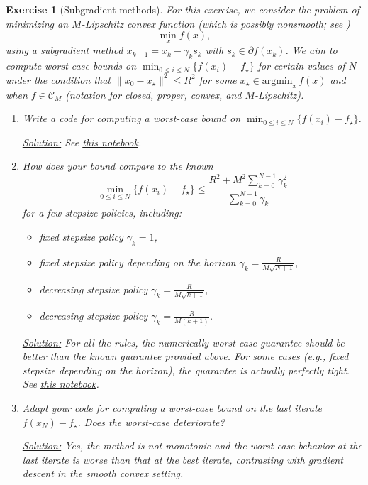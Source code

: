 \documentclass[11pt,a4paper]{article}
\newcommand{\correction}[1]{{{\color{blue}\underline{Solution:} #1}}}
\newcommand{\correction}[1]{}
\newtheorem{exercise}{Exercise}
\begin{document}
\begin{exercise}[Subgradient methods]\label{ex:subgradient} For this exercise, we consider the problem of minimizing an $M$-Lipschitz convex function (which is possibly nonsmooth; see )
	\[ \min_{x} f(x),\]
using a subgradient method $x_{k+1}=x_k-\gamma_k s_k$ with $s_k\in\partial f(x_k)$. We aim to compute worst-case bounds on $\min_{0\leqslant i\leqslant N}\{f(x_i)-f_\star\}$ for certain values of $N$ under the condition that $\|x_0-x_\star\|^2\leqslant R^2$ for some $x_\star\in\mathrm{argmin}_x \,f(x)$ and when $f\in\mathcal{C}_M$ (notation for closed, proper, convex, and $M$-Lipschitz). 
	\begin{enumerate}
	\item Write a code for computing a worst-case bound on $\min_{0\leqslant i\leqslant N}\{f(x_i)-f_\star\}$.
	
	\correction{See \href{https://github.com/PerformanceEstimation/Learning-Performance-Estimation/tree/main/Codes/Jupyter/Exercise08.ipynb}{this notebook}.}	
	
	\item How does your bound compare to the known
	\[ \min_{0\leqslant i\leqslant N}\{f(x_i)-f_\star\} \leqslant \frac{R^2+M^2\sum_{k=0}^{N-1}\gamma_k^2}{\sum_{k=0}^{N-1}\gamma_k}\]
	for a few stepsize policies, including:
	\begin{itemize}
	\item fixed stepsize policy $\gamma_k=1$,
	\item fixed stepsize policy depending on the horizon $\gamma_k=\frac{R}{M\sqrt{N+1}}$,
	\item decreasing stepsize policy $\gamma_k=\frac{R}{M\sqrt{k+1}}$,
	\item decreasing stepsize policy $\gamma_k=\frac{R}{M(k+1)}$.
	\end{itemize}
	
	\correction{For all the rules, the numerically worst-case guarantee should be better than the known guarantee provided above. For some cases (e.g., fixed stepsize depending on the horizon), the guarantee is actually perfectly tight. See \href{https://github.com/PerformanceEstimation/Learning-Performance-Estimation/tree/main/Codes/Jupyter/Exercise08.ipynb}{this notebook}.}
	
	\item Adapt your code for computing a worst-case bound on the last iterate $f(x_N)-f_\star$. Does the worst-case deteriorate?
	
	\correction{Yes, the method is not monotonic and the worst-case behavior at the last iterate is worse than that at the best iterate, contrasting with gradient descent in the smooth convex setting.}
	

\end{enumerate}
\end{exercise}
\end{document}
